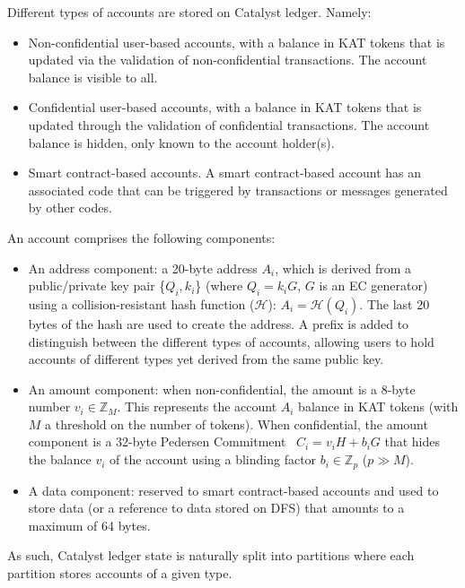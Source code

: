 Different types of accounts are stored on Catalyst ledger. Namely:

\begin{itemize}
\item Non-confidential user-based accounts, with a balance in KAT tokens that is updated via the validation of non-confidential transactions. The account balance is visible to all.
\item Confidential user-based accounts, with a balance in KAT tokens that is updated through the validation of confidential transactions. The account balance is hidden, only known to the account holder(s).
\item Smart contract-based accounts. A smart contract-based account has an associated code that can be triggered by transactions or messages generated by other codes.
\end{itemize}

An account comprises the following components: 

\begin{itemize}
\item An address component: a 20-byte address $A_{i}$, which is derived from a public/private key pair \{$Q_{i},k_{i}$\} (where $Q_i= k_{i}G$, $G$ is an EC generator) using a collision-resistant hash function ($\mathcal{H}$): $A_{i} = \mathcal{H}(Q_{i})$. The last 20 bytes of the hash are used to create the address. A prefix is added to distinguish between the different types of accounts, allowing users to hold accounts of different types yet derived from the same public key. 
\item An amount component: when non-confidential, the amount is a 8-byte number $v_{i} \in \mathbb{Z}_M$. This represents the account $A_{i}$ balance in KAT tokens (with $M$ a threshold on the number of tokens). When confidential, the amount component is a 32-byte Pedersen Commitment~\cite{confidential} $C_{i} = v_{i}H + b_{i}G$ that hides the balance $v_i$ of the account using a blinding factor $b_{i} \in \mathbb{Z}_p$ ($p \gg M$).
\item A data component: reserved to smart contract-based accounts and used to store data (or a reference to data stored on DFS) that amounts to a maximum of 64 bytes. 
\end{itemize}

As such, Catalyst ledger state is naturally split into partitions where each partition stores accounts of a given type.

